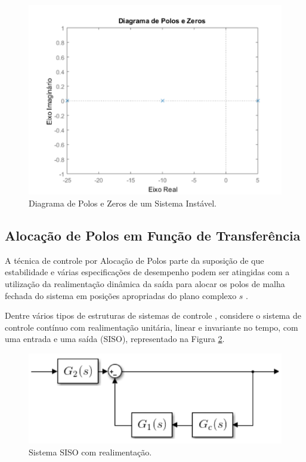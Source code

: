 \documentclass[journal,brazil,english]{IEEEtran}
\begin{document}
\begin{figure}[H]
	\centering
	\includegraphics[width=\columnwidth]{./imagens/sistema_instavel.pdf}
    \renewcommand{\figurename}{Fig.}
    \caption{Diagrama de Polos e Zeros de um Sistema Instável.}
	\label{instavel}
\end{figure}

\subsection{Alocação de Polos em Função de Transferência}\label{alocacaoFT}
A técnica de controle por Alocação de Polos parte da suposição de que estabilidade e várias especificações de desempenho podem ser atingidas com a utilização da realimentação dinâmica da saída para alocar os polos de malha fechada do sistema em posições apropriadas do plano complexo $s$ \cite{maitelli}.

Dentre vários tipos de estruturas de sistemas de controle \cite{ogata}, considere o sistema de controle contínuo com realimentação unitária, linear e invariante no tempo, com uma entrada e uma saída (SISO), representado na Figura \ref{ggc}.

\begin{figure}[H]
	\centering
	\includegraphics[width=\columnwidth]{./imagens/siso.pdf}
    \renewcommand{\figurename}{Fig.}
    \caption{Sistema SISO com realimentação.}
	\label{ggc}
\end{figure}
\end{document}
